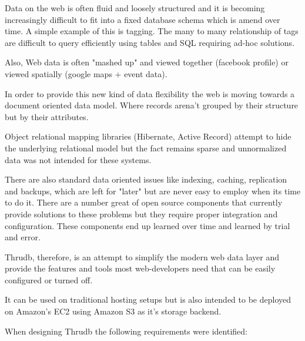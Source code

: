\documentclass[nocopyrightspace,blockstyle]{sigplanconf}
\begin{document}
Data on the web is often fluid and loosely structured and it is becoming increasingly difficult to fit into a fixed database schema which is amend over time.
A simple example of this is tagging. The many to many relationship of tags are difficult to query efficiently using tables and SQL requiring ad-hoc solutions.

Also, Web data is often "mashed up" and viewed together (facebook profile) or viewed spatially (google maps + event data).

In order to provide this new kind of data flexibility the web is moving towards a document oriented data model.  Where records arena't grouped by their structure but by their attributes.

Object relational mapping libraries (Hibernate, Active Record) attempt to hide the underlying relational model but the fact remains sparse and unnormalized data was not intended for these systems.

There are also standard data oriented issues like indexing, caching, replication and backups, which are left for "later" but are never easy to employ when its time to do it.
There are a number great of open source components that currently provide solutions to these problems but they require proper integration and configuration.  These components end up learned over time and learned by trial and error.

Thrudb, therefore, is an attempt to simplify the modern web data layer and provide the features and tools most web-developers need that can be easily configured or turned off.

It can be used on traditional hosting setups but is also intended to be deployed on Amazon's EC2 using Amazon S3 as it's storage backend.

When designing Thrudb the following requirements were identified:
\end{document}
